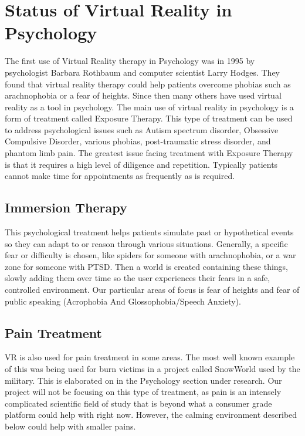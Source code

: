 \documentclass[a4paper,10pt]{article}
\begin{document}
	\pagebreak
	
	\section{Status of Virtual Reality in Psychology}
	The first use of Virtual Reality therapy in Psychology was in 1995 by psychologist Barbara Rothbaum and computer scientist Larry Hodges. They found that virtual reality therapy could help patients overcome phobias such as arachnophobia or a fear of heights. Since then many others	have used virtual reality as a tool in psychology. The main use of virtual reality in psychology is a form of treatment called Exposure Therapy.	This type of treatment can be used to address psychological issues such as Autism spectrum disorder, Obsessive Compulsive Disorder, various phobias,	post-traumatic stress disorder, and phantom limb pain. The greatest issue facing treatment with Exposure Therapy is that it requires a high level of diligence and repetition. Typically patients cannot make time for appointments as frequently as is required.
	
	\subsection{Immersion Therapy}
	This psychological treatment helps patients simulate past or hypothetical events so they can adapt to or reason through various situations. Generally, a specific fear or difficulty is chosen, like spiders for someone with arachnophobia, or a war zone for someone with PTSD.  Then a world is created containing these things, slowly adding them over time so the user experiences their fears in a safe, controlled environment. Our particular areas of focus is fear of heights and fear of public speaking (Acrophobia And Glossophobia/Speech Anxiety).
	
	\subsection{Pain Treatment}
	VR is also used for pain treatment in some areas.  The most well known example of this was being used for burn victims in a project called SnowWorld used by the military.  This is elaborated on in the Psychology section under research.  Our project will not be focusing on this type of treatment, as pain is an intensely complicated scientific field of study that is beyond what a consumer grade platform could help with right now.  However, the calming environment described below could help with smaller pains.
	
\end{document}

